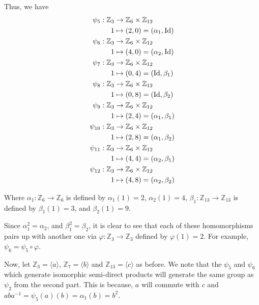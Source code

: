 \documentclass[12pt]{AlgebraQual}
\begin{document}
\begin{solution}
\begin{enumerate}[label=(\alph*)]
    Thus, we have \begin{align*}
        \psi_5:\mathbb{Z}_3&\to\mathbb{Z}_6\times\mathbb{Z}_{12}\\
        1&\mapsto (2,0)=(\alpha_1,\text{Id})\\
        \psi_6:\mathbb{Z}_3&\to\mathbb{Z}_6\times\mathbb{Z}_{12}\\
        1&\mapsto (4,0)=(\alpha_2,\text{Id})\\
        \psi_7:\mathbb{Z}_3&\to\mathbb{Z}_6\times\mathbb{Z}_{12}\\
        1&\mapsto (0,4)=(\text{Id},\beta_1)\\
        \psi_8:\mathbb{Z}_3&\to\mathbb{Z}_6\times\mathbb{Z}_{12}\\
        1&\mapsto (0,8)=(\text{Id},\beta_2)\\
        \psi_9:\mathbb{Z}_3&\to\mathbb{Z}_6\times\mathbb{Z}_{12}\\
        1&\mapsto (2,4)=(\alpha_1,\beta_1)\\
        \psi_{10}:\mathbb{Z}_3&\to\mathbb{Z}_6\times\mathbb{Z}_{12}\\
        1&\mapsto (2,8)=(\alpha_1,\beta_2)\\
        \psi_{11}:\mathbb{Z}_3&\to\mathbb{Z}_6\times\mathbb{Z}_{12}\\
        1&\mapsto (4,4)=(\alpha_2,\beta_1)\\
        \psi_{12}:\mathbb{Z}_3&\to\mathbb{Z}_6\times\mathbb{Z}_{12}\\
        1&\mapsto (4,8)=(\alpha_2,\beta_2)\\
    \end{align*}

    Where $\alpha_1:\mathbb{Z}_6\to\mathbb{Z}_6$ is defined by $\alpha_1(1)=2$, $\alpha_2(1)=4$, $\beta_1:\mathbb{Z}_{13}\to\mathbb{Z}_{13}$ is defined by $\beta_1(1)=3$, and $\beta_2(1)=9$.

    Since $\alpha_1^2=\alpha_2$, and $\beta_1^2=\beta_2$, it is clear to see that each of these homomorphisms pairs up with another one via $\varphi:\mathbb{Z}_3\to\mathbb{Z}_3$ defined by $\varphi(1)=2$. For example, $\psi_6=\psi_5\circ\varphi$.

    Now, let $\mathbb{Z}_3=\langle a\rangle$, $\mathbb{Z}_7=\langle b\rangle$ and $\mathbb{Z}_{13}=\langle c\rangle$ as before. We note that the $\psi_5$ and $\psi_6$ which generate isomorphic semi-direct products will generate the same group as $\psi_2$ from the second part. This is because, $a$ will commute with $c$ and $aba^{-1}=\psi_5(a)(b)=\alpha_1(b)=b^2$.


\end{enumerate}
\end{solution}
\end{document}
